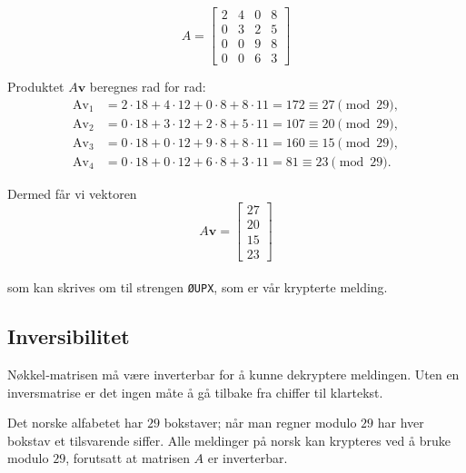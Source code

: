 \documentclass[12pt,a4paper]{article}
\begin{document}
\vspace{6mm}
 
\[ A= \begin{bmatrix} 2 & 4 & 0 & 8 \\ 0 & 3 & 2 & 5 \\ 0 & 0 & 9 & 8 \\ 0 & 0 & 6 & 3 \end{bmatrix} \]

\vspace{7.5mm} %

Produktet $A\mathbf{v}$ beregnes rad for rad:
\\

\[ \begin{aligned} \text{Av}_{1}&=2\cdot18+4\cdot12+0\cdot8+8\cdot11 =172 \equiv 27 \pmod{29},\\[4pt] \text{Av}_{2}&=0\cdot18+3\cdot12+2\cdot8+5\cdot11 =107 \equiv 20 \pmod{29},\\[4pt] \text{Av}_{3}&=0\cdot18+0\cdot12+9\cdot8+8\cdot11 =160 \equiv 15 \pmod{29},\\[4pt] \text{Av}_{4}&=0\cdot18+0\cdot12+6\cdot8+3\cdot11 =81 \equiv 23 \pmod{29}. \end{aligned} \]

\vspace{7.5mm} Dermed får vi vektoren \[ A\mathbf{v}= \begin{bmatrix} 27\\ 20\\ 15\\ 23 \end{bmatrix} \]  \\
\vspace{7.5mm}
som kan skrives om til strengen \texttt{ØUPX}, som er vår krypterte melding.
\vspace{7.5mm}
\subsection{ Inversibilitet}
Nøkkel‑matrisen må være inverterbar for å kunne dekryptere meldingen.
Uten en inversmatrise er det ingen måte å gå tilbake fra chiffer til
klartekst.  

Det norske alfabetet har $29$ bokstaver; når man regner modulo $29$ har hver
bokstav et tilsvarende siffer. Alle meldinger på norsk kan krypteres ved å
bruke modulo $29$, forutsatt at matrisen $A$ er inverterbar.
\vspace{6mm}
\end{document}
